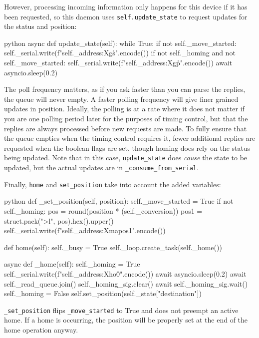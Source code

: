 However, processing incoming information only happens for this device if it has been requested, so this daemon uses \texttt{self.update\_state} to request updates for the status and position:


\begin{codefragment}{python}
async def update_state(self):
    while True:
        if not self._move_started:
            self._serial.write(f"{self._address:X}gs\r\n".encode())
        if not self._homing and not self._move_started:
            self._serial.write(f"{self._address:X}gp\r\n".encode())
        await asyncio.sleep(0.2)
\end{codefragment}

The poll frequency matters, as if you ask faster than you can parse the replies, the queue will never empty.
A faster polling frequency will give finer grained updates in position.
Ideally, the polling is at a rate where it does not matter if you are one polling period later for the purposes of timing control, but that the replies are always processed before new requests are made.
To fully ensure that the queue empties when the timing control requires it, fewer additional replies are requested when the boolean flags are set, though homing does rely on the status being updated.
Note that in this case, \texttt{update\_state} does \textit{cause} the state to be updated, but the actual updates are in \texttt{\_consume\_from\_serial}.

Finally, \texttt{home} and \texttt{set\_position} take into account the added variables:

\begin{codefragment}{python}
def _set_position(self, position):
    self._move_started = True
    if not self._homing:
        pos = round(position * (self._conversion))
        pos1 = struct.pack(">l", pos).hex().upper()
        self._serial.write(f"{self._address:X}ma{pos1}\r\n".encode())

def home(self):
    self._busy = True
    self._loop.create_task(self._home())

async def _home(self):
    self._homing = True
    self._serial.write(f"{self._address:X}ho0\r\n".encode())
    await asyncio.sleep(0.2)
    await self._read_queue.join()
    self._homing_sig.clear()
    await self._homing_sig.wait()
    self._homing = False
    self.set_position(self._state["destination"])
\end{codefragment}

\texttt{\_set\_position} flips \texttt{\_move\_started} to True and does not preempt an active home.
If a home is occurring, the position will be properly set at the end of the home operation anyway.

